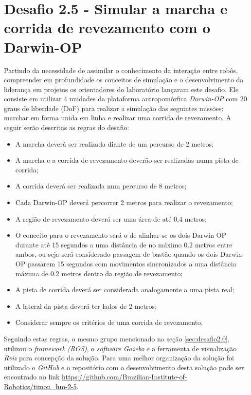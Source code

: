 \section{Desafio 2.5 - Simular a marcha e corrida de revezamento com o Darwin-OP}
\label{sec:desafio2.5}

Partindo da necessidade de assimilar o conhecimento da interação entre robôs, compreender em profundidade os conceitos de simulação e o desenvolvimento da liderança em projetos os orientadores do laboratório lançaram este desafio. Ele consiste em utilizar 4 unidades da plataforma antropomórfica \textit{Darwin-OP} com 20 graus de liberdade (DoF) para realizar a simulação das seguintes missões: marchar em forma unida em linha e realizar uma corrida de revezamento. A seguir serão descritas as regras do desafio:

\begin{itemize}
  \item A marcha deverá ser realizada diante de um percurso de 2 metros;
  \item A marcha e a corrida de revezamento deverão ser realizadas numa pista de corrida;
  \item A corrida deverá ser realizada num percurso de 8 metros;
  \item Cada Darwin-OP deverá percorrer 2 metros para realizar o revezamento;
  \item A região de revezamento deverá ser uma área de até 0,4 metros;
  \item O conceito para o revezamento será o de alinhar-se os dois Darwin-OP durante até 15 segundos a uma distância de no máximo 0.2 metros entre ambos, ou seja será considerado passagem de bastão quando os dois Darwin-OP passarem 15 segundos com movimentos sincronizados a uma distância máxima de 0.2 metros dentro da
  região de revezamento;
  \item A pista de corrida deverá ser considerada analogamente a uma pista real;
  \item A lateral da pista deverá ter lados de 2 metros;
  \item Considerar sempre os critérios de uma corrida de revezamento.
\end{itemize}

Seguindo estas regras, o mesmo grupo mencionado na seção \ref{sec:desafio2.0}, utilizou o \textit{framework (ROS)}, o \textit{software {Gazebo}} e a ferramenta de visualização \textit{Rviz} para concepção da solução. Para uma melhor organização da solução foi utilizado o \textit{GitHub} e o repositório com o desenvolvimento desta solução pode ser encontrado no link \url{https://github.com/Brazilian-Institute-of-Robotics/timon_hm-2-5}.

